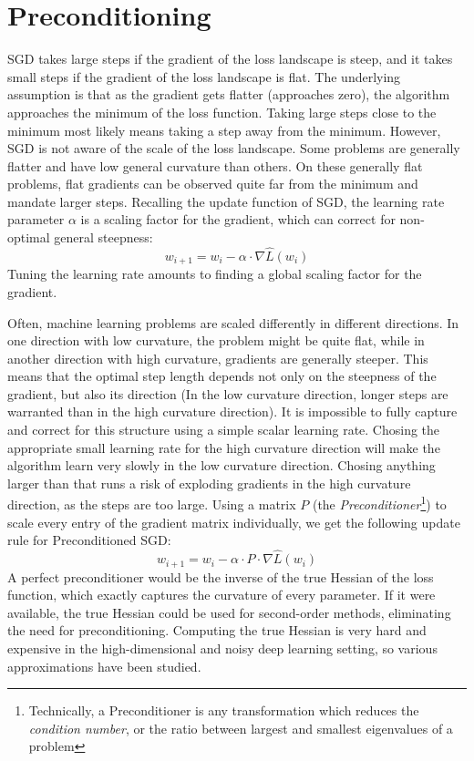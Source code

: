 \documentclass[twoside,12pt,a4paper]{report}
\begin{document}
\section{Preconditioning} \label{sec:preconditioning}
SGD takes large steps if the gradient of the loss landscape is steep, and it takes small steps if the gradient of the loss landscape is flat. The underlying assumption is that as the gradient gets flatter (approaches zero), the algorithm approaches the minimum of the loss function. Taking large steps close to the minimum most likely means taking a step away from the minimum.
However, SGD is not aware of the scale of the loss landscape. Some problems are generally flatter and have low general curvature than others. On these generally flat problems, flat gradients can be observed quite far from the minimum and mandate larger steps.
Recalling the update function of SGD, the learning rate parameter $\alpha$ is a scaling factor for the gradient, which can correct for non-optimal general steepness:
$$w_{i+1} = w_i - \alpha \cdot \nabla \hat{L}(w_i) $$
Tuning the learning rate amounts to finding a global scaling factor for the gradient.

Often, machine learning problems are scaled differently in different directions. In one direction with low curvature, the problem might be quite flat, while in another direction with high curvature, gradients are generally steeper. This means that the optimal step length depends not only on the steepness of the gradient, but also its direction (In the low curvature direction, longer steps are warranted than in the high curvature direction).
It is impossible to fully capture and correct for this structure using a simple scalar learning rate. Chosing the appropriate small learning rate for the high curvature direction will make the algorithm learn very slowly in the low curvature direction. Chosing anything larger than that runs a risk of exploding gradients in the high curvature direction, as the steps are too large.
Using a matrix $P$ (the \textit{Preconditioner}\footnote{Technically, a Preconditioner is any transformation which reduces the \textit{condition number}, or the ratio between largest and smallest eigenvalues of a problem}) to scale every entry of the gradient matrix individually, we get the following update rule for Preconditioned SGD:
$$w_{i+1} = w_i - \alpha \cdot P \cdot \nabla \hat{L}(w_i) $$
A perfect preconditioner would be the inverse of the true Hessian of the loss function, which exactly captures the curvature of every parameter. If it were available, the true Hessian could be used for second-order methods, eliminating the need for preconditioning.
Computing the true Hessian is very hard and expensive in the high-dimensional and noisy deep learning setting, so various approximations have been studied. 
\end{document}
